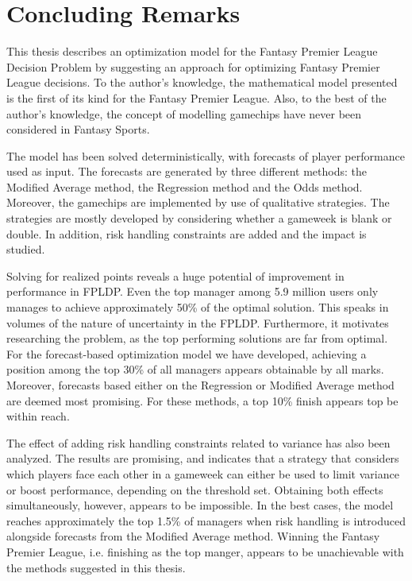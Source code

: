 \chapter{Concluding Remarks}

This thesis describes an optimization model for the Fantasy Premier League Decision Problem by suggesting an approach for optimizing Fantasy Premier League decisions. To the author's knowledge, the mathematical model presented is the first of its kind for the Fantasy Premier League. Also, to the best of the author's knowledge, the concept of modelling gamechips have never been considered in Fantasy Sports. 

\newpar

The model has been solved deterministically, with forecasts of player performance used as input. The forecasts are generated by three different methods: the Modified Average method, the Regression method and the Odds method. Moreover, the gamechips are implemented by use of qualitative strategies. The strategies are mostly developed by considering whether a gameweek is blank or double. In addition, risk handling constraints are added and the impact is studied.

\newpar

Solving for realized points reveals a huge potential of improvement in performance in FPLDP. Even the top manager among 5.9 million users only manages to achieve approximately 50\% of the optimal solution. This speaks in volumes of the nature of uncertainty in the FPLDP. Furthermore, it motivates researching the problem, as the top performing solutions are far from optimal. For the forecast-based optimization model we have developed, achieving a position among the top 30\% of all managers appears obtainable by all marks. Moreover, forecasts based either on the Regression or Modified Average method are deemed most promising. For these methods, a top 10\% finish appears top be within reach. 


\newpar

The effect of adding risk handling constraints related to variance has also been analyzed. The results are promising, and indicates that a strategy that considers which players face each other in a gameweek can either be used to limit variance or boost performance, depending on the threshold set. Obtaining both effects simultaneously, however, appears to be impossible. In the best cases, the model reaches approximately the top 1.5\% of managers when risk handling is introduced alongside forecasts from the Modified Average method. Winning the Fantasy Premier League, i.e. finishing as the top manger, appears to be unachievable with the methods suggested in this thesis.

